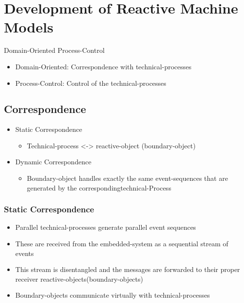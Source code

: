 \hypertarget{development-of-reactive-machine-models}{%
\section{Development of Reactive Machine
Models}\label{development-of-reactive-machine-models}}

Domain-Oriented Process-Control

\begin{itemize}
\tightlist
\item
  Domain-Oriented: Correspondence with technical-processes
\item
  Process-Control: Control of the technical-processes
\end{itemize}

\hypertarget{correspondence}{%
\subsection{Correspondence}\label{correspondence}}

\begin{itemize}
\tightlist
\item
  Static Correspondence

  \begin{itemize}
  \tightlist
  \item
    Technical-process \textless{}-\textgreater{} reactive-object
    (boundary-object)
  \end{itemize}
\item
  Dynamic Correspondence

  \begin{itemize}
  \tightlist
  \item
    Boundary-object handles exactly the same event-sequences that are
    generated by the correspondingtechnical-Process
  \end{itemize}
\end{itemize}

\hypertarget{static-correspondence}{%
\subsubsection{Static Correspondence}\label{static-correspondence}}

\begin{itemize}
\tightlist
\item
  Parallel technical-processes generate parallel event sequences
\item
  These are received from the embedded-system as a sequential stream of
  events
\item
  This stream is disentangled and the messages are forwarded to their
  proper receiver reactive-objects(boundary-objects)
\item
  Boundary-objects communicate virtually with technical-processes
\end{itemize}

